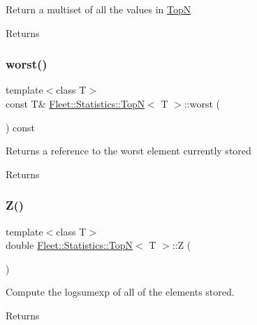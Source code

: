Return a multiset of all the values in \hyperlink{class_fleet_1_1_statistics_1_1_top_n}{TopN} \begin{DoxyReturn}{Returns}

\end{DoxyReturn}
\mbox{\label{class_fleet_1_1_statistics_1_1_top_n_aab552495129498fc792b8d5990c6a746}} 
\subsubsection{\texorpdfstring{worst()}{worst()}}
{\footnotesize\ttfamily template$<$class T$>$ \\
const T\& \hyperlink{class_fleet_1_1_statistics_1_1_top_n}{Fleet\+::\+Statistics\+::\+TopN}$<$ T $>$\+::worst (\begin{DoxyParamCaption}{ }\end{DoxyParamCaption}) const\hspace{0.3cm}{\ttfamily [inline]}}

Returns a reference to the worst element currently stored \begin{DoxyReturn}{Returns}

\end{DoxyReturn}
\mbox{\label{class_fleet_1_1_statistics_1_1_top_n_aa94e0f1e4df0ba70b35abcc540b7cb03}} 
\subsubsection{\texorpdfstring{Z()}{Z()}}
{\footnotesize\ttfamily template$<$class T$>$ \\
double \hyperlink{class_fleet_1_1_statistics_1_1_top_n}{Fleet\+::\+Statistics\+::\+TopN}$<$ T $>$\+::Z (\begin{DoxyParamCaption}{ }\end{DoxyParamCaption})\hspace{0.3cm}{\ttfamily [inline]}}

Compute the logsumexp of all of the elements stored. \begin{DoxyReturn}{Returns}

\end{DoxyReturn}


